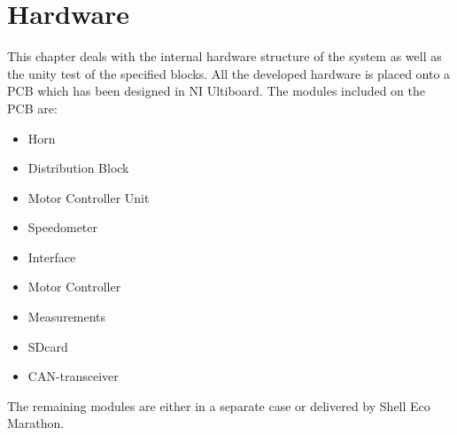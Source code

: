 \chapter{Hardware}
This chapter deals with the internal hardware structure of the system as well as the unity test of the specified blocks. All the developed hardware is placed onto a PCB which has been designed in NI Ultiboard. The modules included on the PCB are:

\begin{itemize}
	\item{Horn}
	\item{Distribution Block}
	\item{Motor Controller Unit}
	\item{Speedometer}
	\item{Interface}
	\item{Motor Controller}
	\item{Measurements}
	\item{SDcard}
	\item{CAN-transceiver}
\end{itemize}

The remaining modules are either in a separate case or delivered by Shell Eco Marathon. 












